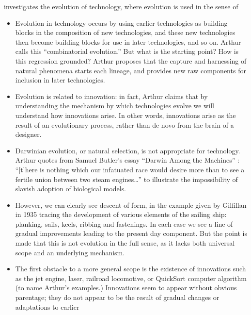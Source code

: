 \autocite{Arthur2009} investigates the evolution of
technology, where evolution is used in the sense of 
\begin{itemize}
		
	\item
	      Evolution in technology occurs by using earlier technologies as
	      building blocks in the composition of new technologies, and these new
	      technologies then become building blocks for use in later
	      technologies, and so on. Arthur calls this ``combinatorial
	      evolution.'' But what is the starting point? How is this regression
	      grounded? Arthur proposes that the capture and harnessing of natural
	      phenomena starts each lineage, and provides new raw components for
	      inclusion in later technologies.
	\item
	      Evolution is related to innovation: in fact, Arthur claims that by
	      understanding the mechanism by which technologies evolve we will
	      understand how innovations arise. In other words, innovations arise
	      as the result of an evolutionary process, rather than de novo from
	      the brain of a designer.
	\item
	      Darwinian evolution, or natural selection, is not appropriate for
	      technology. Arthur quotes from Samuel Butler's essay ``Darwin Among
	      the Machines'' : ``{[}t{]}here is nothing which our infatuated race
	      would desire more than to see a fertile union between two steam
	      engines\ldots{}'' to illustrate the impossibility of slavish
	      adoption of biological models.
	\item
	      However, we can clearly see descent of form, in the example given by
	      Gilfillan in 1935 tracing the development of various elements of the
	      sailing ship: planking, sails, keels, ribbing and fastenings. In
	      each case we see a line of gradual improvements leading to the
	      present day component. But the point is made that this is not
	      evolution in the full sense, as it lacks both universal scope and an
	      underlying mechanism.
	\item
	      The first obstacle to a more general scope is the existence of
	      innovations such as the jet engine, laser, railroad locomotive, or
	      QuickSort computer algorithm (to name Arthur's examples.)
	      Innovations seem to appear without obvious parentage; they do not
	      appear to be the result of gradual changes or adaptations to earlier

\end{itemize}

